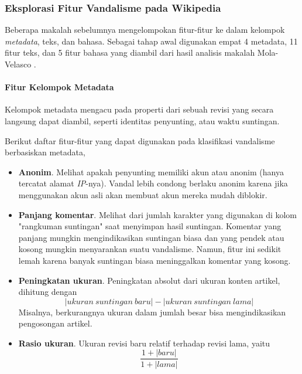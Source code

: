 \subsubsection{Eksplorasi Fitur Vandalisme pada Wikipedia}

Beberapa makalah sebelumnya mengelompokan fitur-fitur ke dalam kelompok \textit{metadata}, teks, dan bahasa.
Sebagai tahap awal digunakan empat 4 metadata, 11 fitur teks, dan 5 fitur bahasa yang diambil dari hasil analisis makalah Mola-Velasco \cite{mola2012wikipedia}.

\paragraph{Fitur Kelompok Metadata}

Kelompok metadata mengacu pada properti dari sebuah revisi yang secara langsung dapat diambil, seperti identitas penyunting, atau waktu suntingan.

Berikut daftar fitur-fitur yang dapat digunakan pada klasifikasi vandalisme berbasiskan metadata,

\begin{itemize}

\item \textbf{Anonim}.
Melihat apakah penyunting memiliki akun atau anonim (hanya tercatat alamat \textit{IP}-nya).
Vandal lebih condong berlaku anonim karena jika menggunakan akun asli akan membuat akun mereka mudah diblokir.

\item \textbf{Panjang komentar}.
Melihat dari jumlah karakter yang digunakan di kolom "rangkuman suntingan" saat menyimpan hasil suntingan.
Komentar yang panjang mungkin mengindikasikan suntingan biasa dan yang pendek atau kosong mungkin menyarankan suatu vandalisme.
Namun, fitur ini sedikit lemah karena banyak suntingan biasa meninggalkan komentar yang kosong.

\item \textbf{Peningkatan ukuran}.
Peningkatan absolut dari ukuran konten artikel, dihitung dengan
\[
|ukuran\ suntingan\ baru| - |ukuran\ suntingan\ lama|
\]
Misalnya, berkurangnya ukuran dalam jumlah besar bisa mengindikasikan pengosongan artikel.

\item \textbf{Rasio ukuran}.
Ukuran revisi baru relatif terhadap revisi lama, yaitu
\[
\frac{1 + |baru|}{1 + |lama|}
\]

\end{itemize}

